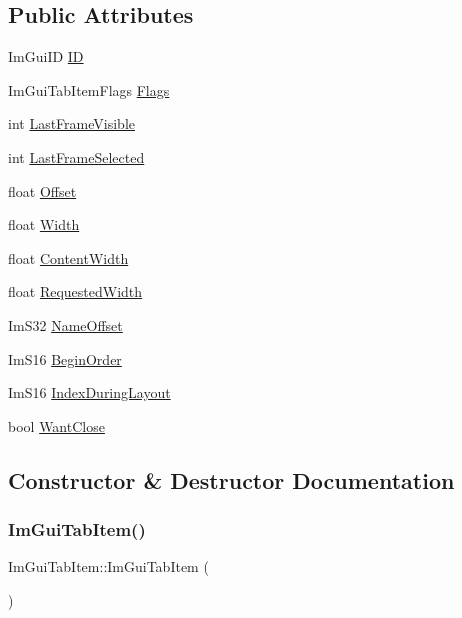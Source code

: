 \subsection*{Public Attributes}
\begin{DoxyCompactItemize}
\item 
Im\+Gui\+ID \hyperlink{structImGuiTabItem_aa1a225e6ac0ee4dfa815fe5c7c63fe92}{ID}
\item 
Im\+Gui\+Tab\+Item\+Flags \hyperlink{structImGuiTabItem_a68c7537c57324068fbca54861eab5c95}{Flags}
\item 
int \hyperlink{structImGuiTabItem_a5f386218e311d8c84db72316f686112a}{Last\+Frame\+Visible}
\item 
int \hyperlink{structImGuiTabItem_ad57f644ed9813c02a9616711320535ac}{Last\+Frame\+Selected}
\item 
float \hyperlink{structImGuiTabItem_ac09eeb85bebba09f18ac959bc32b5cef}{Offset}
\item 
float \hyperlink{structImGuiTabItem_a215d96577ec4396f224524eb8851ff2a}{Width}
\item 
float \hyperlink{structImGuiTabItem_a148bdc4a3de82e2b7983e6b4937730bc}{Content\+Width}
\item 
float \hyperlink{structImGuiTabItem_a53a1bf7ee4ffff89df56047037af2a29}{Requested\+Width}
\item 
Im\+S32 \hyperlink{structImGuiTabItem_a6560d6c4fac208037a7ea19fca37e3f9}{Name\+Offset}
\item 
Im\+S16 \hyperlink{structImGuiTabItem_a800f006e83941963238ed132712dbf2c}{Begin\+Order}
\item 
Im\+S16 \hyperlink{structImGuiTabItem_a5101980b4bec478c8fc7910522a40dc8}{Index\+During\+Layout}
\item 
bool \hyperlink{structImGuiTabItem_a7feae3ddfc1570b1c13230a0ee040be4}{Want\+Close}
\end{DoxyCompactItemize}


\subsection{Constructor \& Destructor Documentation}
\mbox{\label{structImGuiTabItem_a325c1e06aa749d2dece9d0d589f9dfd1}} 
\subsubsection{\texorpdfstring{Im\+Gui\+Tab\+Item()}{ImGuiTabItem()}}
{\footnotesize\ttfamily Im\+Gui\+Tab\+Item\+::\+Im\+Gui\+Tab\+Item (\begin{DoxyParamCaption}{ }\end{DoxyParamCaption})\hspace{0.3cm}{\ttfamily [inline]}}



